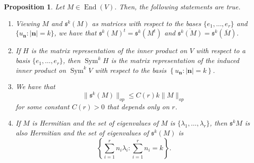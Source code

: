 \documentclass{amsart}
\newtheorem{prop}[thm]{Proposition}
\theoremstyle{definition}
\theoremstyle{remark}
\numberwithin{equation}{section}
\DeclareMathOperator{\Sym}{Sym}
\DeclareMathOperator{\End}{End}
\begin{document}
\begin{prop} \label{prop: sym}
Let $M \in \End(V)$. Then, the following statements are true.
\begin{enumerate}
    \item Viewing $M$ and $\mathfrak{s}^k(M)$ as matrices with respect to the bases $\{e_1, \dotsc, e_r\}$ and $\{u_\mathbf{n} : |\mathbf{n}| = k\}$, we have that $\mathfrak{s}^k(M)^t = \mathfrak{s}^k(M^t)$ and $\overline{\mathfrak{s}^k(M)} = \mathfrak{s}^k(\overline{M})$.
    \item If $H$ is the matrix representation of the inner product on $V$ with respect to a basis $\{e_1, \dotsc, e_r\}$, then $\Sym^k H$ is the matrix representation of the induced inner product on $\Sym^k V$ with respect to the basis $\left \{ u_\mathbf{n} : |\mathbf{n}| = k \right \}$.
    \item We have that
    $$
    \|\mathfrak{s}^k(M) \|_{op} \leq C(r)k\|M\|_{op}
    $$
    for some constant $C(r) > 0$ that depends only on $r$.
    \item If $M$ is Hermitian and the set of eigenvalues of $M$ is $\{\lambda_1, \dotsc, \lambda_r\}$, then $\mathfrak{s}^k M$ is also Hermitian and the set of eigenvalues of $\mathfrak{s}^k(M)$ is 
    $$
    \left \{ \sum_{i=1}^r n_i \lambda_i : \sum_{i=1}^r n_i = k \right \}.
    $$
\end{enumerate}
\end{prop}
\end{document}
